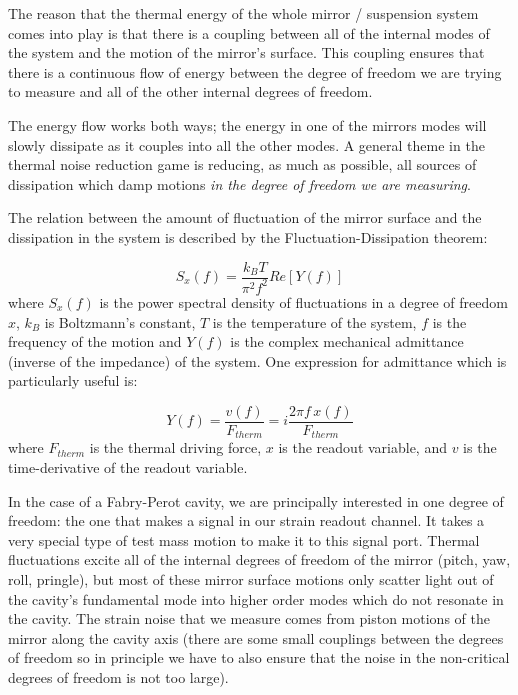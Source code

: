 The reason that the thermal energy of the whole mirror / suspension system 
comes into play is that there is a coupling between all of the internal modes 
of the system and the motion of the mirror's surface. This coupling ensures 
that there is a continuous flow of energy between the degree of freedom we 
are trying to measure and all of the other internal degrees of freedom. 

The energy flow works both ways; the energy in one of the mirrors modes will
slowly dissipate as it couples into all the other modes. A general theme in
the thermal noise reduction game is reducing, as much as possible, all sources
of dissipation which damp motions \emph{in the degree of freedom we are
measuring}.

The relation between the amount of fluctuation of the mirror surface
and the dissipation in the system is described by the 
Fluctuation-Dissipation theorem\cite{Callen:FD}:

\begin{equation}
S_{x}(f) = \frac{k_{B} T}{\pi^{2} f^{2}} Re[Y(f)]
\end{equation}
where $S_{x}(f)$ is the power spectral density of fluctuations in a degree of
freedom $x$, $k_B$ is Boltzmann's constant, $T$ is the temperature of the system,
$f$ is the frequency of the motion and $Y(f)$ is the complex mechanical admittance 
(inverse of the impedance) of the system. One expression for admittance which 
is particularly useful is\cite{Saulson:Book}:

\begin{equation}
Y(f) = \frac{v(f)}{F_{therm}} = i \frac{2 \pi f \, x(f)}{F_{therm}}
\end{equation}
where $F_{therm}$ is the thermal driving force, $x$ is the readout variable,
and $v$ is the time-derivative of the readout variable.

In the case of a Fabry-Perot cavity, we are principally interested in one
degree of freedom: the one that makes a signal in our strain readout
channel. It takes a very special type of test mass motion to make it to
this signal port. Thermal fluctuations excite all of the internal degrees
of freedom of the mirror (pitch, yaw, roll, pringle), but most of these mirror 
surface motions only scatter light out of the cavity's fundamental mode 
into higher order modes which do not resonate in the cavity. The strain noise
that we measure comes from piston motions of the mirror along the cavity axis
(there are some small couplings between the degrees of freedom so in principle
we have to also ensure that the noise in the non-critical degrees of freedom is
not too large).

